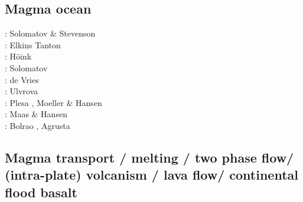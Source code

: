 \subsection{Magma ocean}

\begin{scriptsize}
\nineteenninetythree: Solomatov \& Stevenson \cite{sost93a,sost93b}\\
\twothousandtwo: Elkins Tanton \etal \cite{elvh02}\\
\twothousandsix: H\"oink \etal\cite{hosh06}\\
\twothousandseven: Solomatov \cite{solo07} \\
\twothousandten: de Vries \etal \cite{devv10}\\
\twothousandtwelve: Ulvrova \etal \cite{ullc12}\\
\twothousandthirteen: Plesa \etal \cite{plth13}, Moeller \& Hansen \cite{moha13}\\
\twothousandfifteen: Maas \& Hansen \cite{maha15}\\
\twothousandtwenty: Bolrao \etal \cite{bobm20}, Agrusta \etal \cite{agml20}
\end{scriptsize}

\subsection{Magma transport / melting / two phase flow/ (intra-plate) volcanism / lava flow/ 
continental flood basalt}

